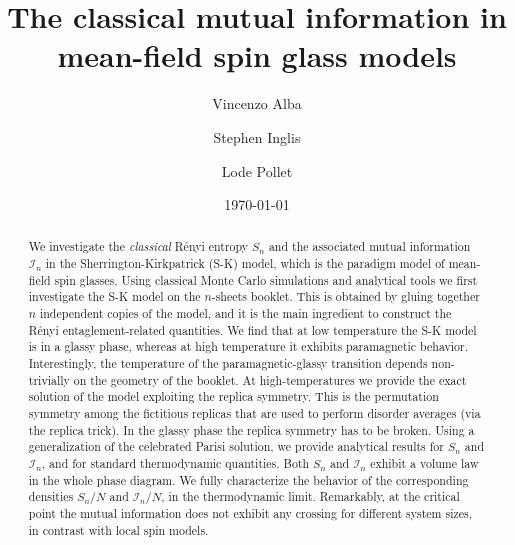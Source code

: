 \documentclass[twocolumn,superscriptaddress,prb,10pt]{revtex4-1}
\begin{document}
\title{The classical mutual information in mean-field spin glass models} 

\author{Vincenzo Alba}
\author{Stephen Inglis}
\author{Lode Pollet}

\date{\today}




\begin{abstract} 

We investigate the \emph{classical} R\'enyi entropy $S_n$ and the associated mutual 
information ${\mathcal I}_n$ in the Sherrington-Kirkpatrick (S-K) model, which is the 
paradigm model of mean-field spin glasses. 
Using classical Monte Carlo simulations and analytical tools we first investigate the 
S-K model on the $n$-sheets booklet.
This is obtained by gluing together $n$ independent copies of the model, and it is the 
main ingredient to construct the R\'enyi entaglement-related quantities. We find that at 
low temperature the S-K model is in a glassy phase, whereas at high temperature it exhibits 
paramagnetic behavior. Interestingly, the temperature of the paramagnetic-glassy 
transition depends non-trivially on the geometry of the booklet. At high-temperatures 
we provide the exact solution of the model exploiting the replica symmetry. This is the 
permutation symmetry among the fictitious replicas that are used to 
perform disorder averages (via the replica trick). In the glassy phase the replica symmetry 
has to be broken. Using a generalization of the celebrated Parisi solution, we provide 
analytical results for $S_n$ and ${\mathcal I}_n$, and for standard thermodynamic quantities. 
Both $S_n$ and ${\mathcal I}_n$ exhibit a volume law in the whole phase diagram. We fully 
characterize the behavior of the corresponding densities $S_n/N$ and ${\mathcal I}_n/N$, 
in the thermodynamic limit. Remarkably, at the critical point the mutual information does 
not exhibit any crossing for different system sizes, in contrast with local spin models. 

\end{abstract}

\end{document}
